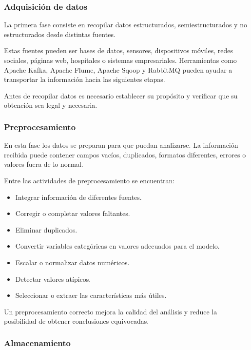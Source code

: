 \subsubsection*{Adquisición de datos}

La primera fase consiste en recopilar datos estructurados, semiestructurados y
no estructurados desde distintas fuentes.

Estas fuentes pueden ser bases de datos, sensores, dispositivos móviles,
redes sociales, páginas web, hospitales o sistemas empresariales. Herramientas
como Apache Kafka, Apache Flume, Apache Sqoop y RabbitMQ pueden ayudar a
transportar la información hacia las siguientes etapas.

Antes de recopilar datos es necesario establecer su propósito y verificar que
su obtención sea legal y necesaria.

\subsubsection*{Preprocesamiento}

En esta fase los datos se preparan para que puedan analizarse. La información
recibida puede contener campos vacíos, duplicados, formatos diferentes, errores
o valores fuera de lo normal.

Entre las actividades de preprocesamiento se encuentran:

\begin{itemize}
    \item Integrar información de diferentes fuentes.
    \item Corregir o completar valores faltantes.
    \item Eliminar duplicados.
    \item Convertir variables categóricas en valores adecuados para el modelo.
    \item Escalar o normalizar datos numéricos.
    \item Detectar valores atípicos.
    \item Seleccionar o extraer las características más útiles.
\end{itemize}

Un preprocesamiento correcto mejora la calidad del análisis y reduce la
posibilidad de obtener conclusiones equivocadas.

\subsubsection*{Almacenamiento}

